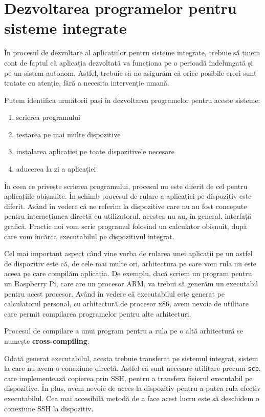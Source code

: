 \section{Dezvoltarea programelor pentru sisteme integrate}
\label{sec:embed:dev}

În procesul de dezvoltare al aplicațiilor pentru sisteme integrate, trebuie să
ținem cont de faptul că aplicația dezvoltată va funcționa pe o perioadă
îndelungată și pe un sistem autonom. Astfel, trebuie să ne asigurăm că orice
posibile erori sunt tratate cu atenție, fără a necesita intervenție umană.

Putem identifica următorii pași în dezvoltarea programelor pentru aceste
sisteme:

\begin{enumerate}
	\item scrierea programului
	\item testarea pe mai multe dispozitive
	\item instalarea aplicației pe toate dispozitivele necesare
	\item aducerea la zi a aplicației
\end{enumerate}

În ceea ce privește scrierea programului, procesul nu este diferit de cel pentru
aplicațiile obișnuite. În schimb procesul de rulare a aplicației pe dispozitiv
este diferit. Având în vedere că ne referim la dispozitive care nu au fost
concepute pentru interacțiunea directă cu utilizatorul, acestea nu au, în general,
interfață grafică. Practic noi vom scrie programul folosind un calculator
obișnuit, după care vom încărca executabilul pe dispozitivul integrat.

Cel mai important aspect când vine vorba de rularea unei aplicații pe un astfel
de dispozitiv este că, de cele mai multe ori, arhitectura pe care vom rula nu este
aceea pe care compilăm aplicația. De exemplu, dacă scriem un program pentru un
Raspberry Pi, care are un procesor ARM, va trebui să generăm un executabil
pentru acest procesor. Având în vedere că executabilul este generat pe
calculatorul personal, cu arhitectură de procesor x86, avem nevoie de utilitare care permit
compilarea programelor pentru alte arhitecturi.

Procesul de compilare a unui program pentru a rula pe o altă arhitectură se
numește \textbf{cross-compiling}.

Odată generat executabilul, acesta trebuie transferat pe sistemul integrat,
sistem la care nu avem o conexiune directă. Astfel că sunt necesare utilitare
precum \texttt{scp}, care implementează copierea prin SSH, pentru a transfera fișierul executabil pe dispozitive. În plus, avem
nevoie de acces la dispozitiv pentru a putea rula efectiv executabilul. Cea mai
accesibilă metodă de a face acest lucru este să deschidem o conexiune SSH la
dispozitiv.

